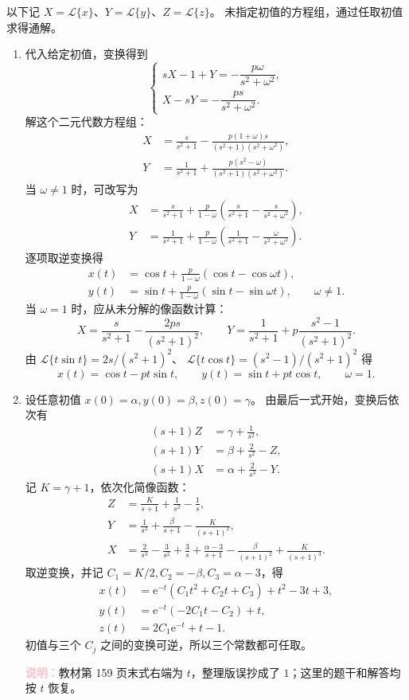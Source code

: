 \documentclass[UTF8,a4paper,11pt]{ctexart}
\newcommand{\e}{\mathrm e}
\newcommand{\note}[1]{\par\smallskip\noindent\textcolor{pink}{\bfseries 说明：}#1\par\smallskip}
\begin{document}
\begin{solution}
以下记 $X=\mathcal L\{x\}$、$Y=\mathcal L\{y\}$、$Z=\mathcal L\{z\}$。
未指定初值的方程组，通过任取初值求得通解。
\begin{enumerate}[label=(\arabic*)]
\item 代入给定初值，变换得到
\[
\begin{cases}
sX-1+Y=-\dfrac{p\omega}{s^2+\omega^2},\\[5pt]
X-sY=-\dfrac{ps}{s^2+\omega^2}.
\end{cases}
\]
解这个二元代数方程组：
\[
\begin{aligned}
X&=\frac{s}{s^2+1}
-\frac{p(1+\omega)s}{(s^2+1)(s^2+\omega^2)},\\
Y&=\frac1{s^2+1}
+\frac{p(s^2-\omega)}{(s^2+1)(s^2+\omega^2)}.
\end{aligned}
\]
当 $\omega\ne1$ 时，可改写为
\[
\begin{aligned}
X&=\frac{s}{s^2+1}+\frac{p}{1-\omega}
\left(\frac{s}{s^2+1}-\frac{s}{s^2+\omega^2}\right),\\
Y&=\frac1{s^2+1}+\frac{p}{1-\omega}
\left(\frac1{s^2+1}-\frac{\omega}{s^2+\omega^2}\right).
\end{aligned}
\]
逐项取逆变换得
\[
\boxed{\begin{aligned}
x(t)&=\cos t+\frac{p}{1-\omega}(\cos t-\cos\omega t),\\
y(t)&=\sin t+\frac{p}{1-\omega}(\sin t-\sin\omega t),\qquad \omega\ne1.
\end{aligned}}
\]
当 $\omega=1$ 时，应从未分解的像函数计算：
\[
X=\frac{s}{s^2+1}-\frac{2ps}{(s^2+1)^2},\qquad
Y=\frac1{s^2+1}+p\frac{s^2-1}{(s^2+1)^2}.
\]
由 $\mathcal L\{t\sin t\}=2s/(s^2+1)^2$、
$\mathcal L\{t\cos t\}=(s^2-1)/(s^2+1)^2$ 得
\[
\boxed{x(t)=\cos t-pt\sin t,\qquad
y(t)=\sin t+pt\cos t,\qquad\omega=1.}
\]

\item 设任意初值 $x(0)=\alpha,y(0)=\beta,z(0)=\gamma$。
由最后一式开始，变换后依次有
\[
\begin{aligned}
(s+1)Z&=\gamma+\frac1{s^2},\\
(s+1)Y&=\beta+\frac2{s^2}-Z,\\
(s+1)X&=\alpha+\frac2{s^3}-Y.
\end{aligned}
\]
记 $K=\gamma+1$，依次化简像函数：
\[
\begin{aligned}
Z&=\frac{K}{s+1}+\frac1{s^2}-\frac1s,\\
Y&=\frac1{s^2}+\frac{\beta}{s+1}-\frac{K}{(s+1)^2},\\
X&=\frac2{s^3}-\frac3{s^2}+\frac3s
+\frac{\alpha-3}{s+1}-\frac{\beta}{(s+1)^2}+\frac{K}{(s+1)^3}.
\end{aligned}
\]
取逆变换，并记 $C_1=K/2,C_2=-\beta,C_3=\alpha-3$，得
\[
\boxed{\begin{aligned}
x(t)&=\e^{-t}(C_1t^2+C_2t+C_3)+t^2-3t+3,\\
y(t)&=\e^{-t}(-2C_1t-C_2)+t,\\
z(t)&=2C_1\e^{-t}+t-1.
\end{aligned}}
\]
初值与三个 $C_j$ 之间的变换可逆，所以三个常数都可任取。
\note{教材第 159 页末式右端为 $t$，整理版误抄成了 $1$；这里的题干和解答均按 $t$ 恢复。}


\end{enumerate}
\end{solution}
\end{document}
